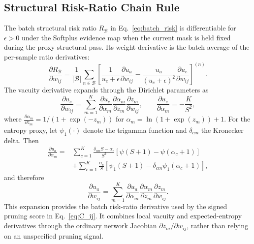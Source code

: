 \documentclass[letterpaper]{article} %
\begin{document}
\subsection{Structural Risk-Ratio Chain Rule}
\label{app:r_chain}
The batch structural risk ratio $R_{\mathcal B}$ in Eq.~\ref{eq:batch_risk} is differentiable for $\epsilon>0$ under the Softplus evidence map when the current mask is held fixed during the proxy structural pass. Its weight derivative is the batch average of the per-sample ratio derivatives:
\begin{equation}
    \frac{\partial R_{\mathcal B}}{\partial w_{ij}}
    =
    \frac{1}{|\mathcal B|}\sum_{n\in\mathcal B}
    \left[
    \frac{1}{u_e+\epsilon}\frac{\partial u_a}{\partial w_{ij}}
    -
    \frac{u_a}{(u_e+\epsilon)^2}
    \frac{\partial u_e}{\partial w_{ij}}
    \right]^{(n)} .
\end{equation}
The vacuity derivative expands through the Dirichlet parameters as
\begin{equation}
    \frac{\partial u_e}{\partial w_{ij}}
    =
    \sum_{m=1}^{K}
    \frac{\partial u_e}{\partial \alpha_m}
    \frac{\partial \alpha_m}{\partial z_m}
    \frac{\partial z_m}{\partial w_{ij}},
    \qquad
    \frac{\partial u_e}{\partial \alpha_m}
    =
    -\frac{K}{S^2},
\end{equation}
where $\frac{\partial \alpha_m}{\partial z_m}=1/(1+\exp(-z_m))$ for $\alpha_m=\ln(1+\exp(z_m))+1$. For the entropy proxy, let $\psi_1(\cdot)$ denote the trigamma function and $\delta_{cm}$ the Kronecker delta. Then
\begin{equation}
\begin{aligned}
    \frac{\partial u_a}{\partial \alpha_m}
    ={}&
    \sum_{c=1}^{K}
    \frac{\delta_{cm}S-\alpha_c}{S^2}
    \left[\psi(S+1)-\psi(\alpha_c+1)\right]\\
    &+
    \sum_{c=1}^{K}
    \frac{\alpha_c}{S}
    \left[
    \psi_1(S+1)-\delta_{cm}\psi_1(\alpha_c+1)
    \right],
\end{aligned}
\end{equation}
and therefore
\begin{equation}
    \frac{\partial u_a}{\partial w_{ij}}
    =
    \sum_{m=1}^{K}
    \frac{\partial u_a}{\partial \alpha_m}
    \frac{\partial \alpha_m}{\partial z_m}
    \frac{\partial z_m}{\partial w_{ij}} .
\end{equation}
This expansion provides the batch risk-ratio derivative used by the signed pruning score in Eq.~\ref{eq:C_ij}. It combines local vacuity and expected-entropy derivatives through the ordinary network Jacobian $\partial z_m/\partial w_{ij}$, rather than relying on an unspecified pruning signal.
\end{document}
